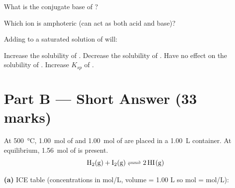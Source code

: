 \documentclass[addpoints]{exam}
\begin{document}
\begin{questions}
\question[1] What is the conjugate base of ?
\begin{choices}
    \choice {}
    \choice {}
    \correctchoice {}
    \choice {}
\end{choices}

\question[1] Which ion is amphoteric (can act as both acid and base)?
\begin{choices}
    \choice {}
    \choice {}
    \correctchoice {}
    \choice {}
\end{choices}

\question[1] Adding  to a saturated solution of  will:
\begin{choices}
    \choice Increase the solubility of .
    \correctchoice Decrease the solubility of .
    \choice Have no effect on the solubility of .
    \choice Increase $K_{sp}$ of .
\end{choices}


\section*{Part B --- Short Answer (33 marks)}

\question At \SI{500}{\celsius}, \SI{1.00}{mol} of  and \SI{1.00}{mol} of  are
placed in a \SI{1.00}{L} container. At equilibrium, \SI{1.56}{mol} of  is present.
\[
\ce{H2(g) + I2(g) <=> 2HI(g)}
\]
\begin{solution}[10cm]
\textbf{(a)} ICE table (concentrations in mol/L, volume = 1.00 L so mol = mol/L):


\end{solution}
\end{questions}
\end{document}

